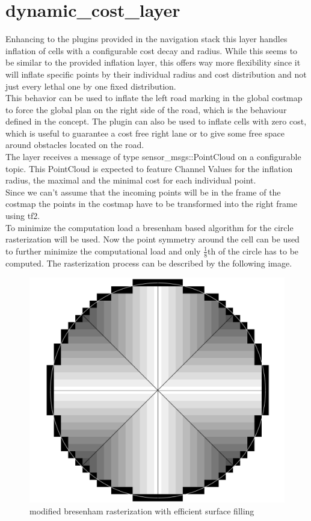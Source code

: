 \section{dynamic\_cost\_layer}
Enhancing to the plugins provided in the navigation stack this layer handles inflation of cells with a configurable cost decay and radius. While this seems to be similar to the provided inflation layer, this offers way more flexibility since it will inflate specific points by their individual radius and cost distribution and not just every lethal one by one fixed distribution.\\

This behavior can be used to inflate the left road marking in the global costmap to force the global plan on the right side of the road, which is the behaviour defined in the concept. The plugin can also be used to inflate cells with zero cost, which is useful to guarantee a cost free right lane or to give some free space around obstacles located on the road.\\

The layer receives a message of type sensor\_msgs::PointCloud on a configurable topic. This PointCloud is expected to feature Channel Values for the inflation radius, the maximal and the minimal cost for each individual point.\\

Since we can't assume that the incoming points will be in the frame of the costmap the points in the costmap have to be transformed into the right frame using tf2.\\

To minimize the computation load a bresenham based algorithm for the circle rasterization will be used.\cite{ComputerGraphics} Now the point symmetry around the cell can be used to further minimize the computational load and only $\frac{1}{8}$th of the circle has to be computed. The rasterization process can be described by the following image.\\

\begin{figure}
	\centering
	\includegraphics[width=.5\textwidth]{Pictures/rasterization}
	\caption{modified bresenham rasterization with efficient surface filling}
	\label{rasterization}
\end{figure}


